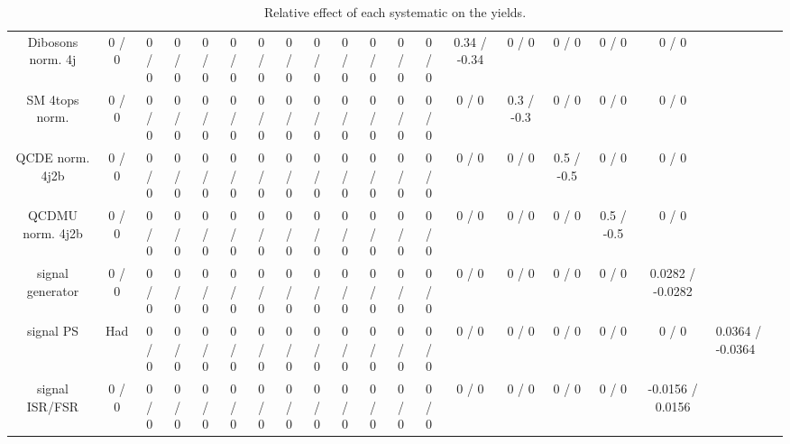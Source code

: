 \documentclass[10pt]{article}
\begin{document}
\begin{table}[htbp]
\begin{center}
\begin{tabular}{|c|c|c|c|c|c|c|c|c|c|c|c|c|c|c|c|c|c|}
  Dibosons norm. 4j & 0 / 0 & 0 / 0 & 0 / 0 & 0 / 0 & 0 / 0 & 0 / 0 & 0 / 0 & 0 / 0 & 0 / 0 & 0 / 0 & 0 / 0 & 0 / 0 & 0.34 / -0.34 & 0 / 0 & 0 / 0 & 0 / 0 & 0 / 0 \\ 
  SM 4tops norm. & 0 / 0 & 0 / 0 & 0 / 0 & 0 / 0 & 0 / 0 & 0 / 0 & 0 / 0 & 0 / 0 & 0 / 0 & 0 / 0 & 0 / 0 & 0 / 0 & 0 / 0 & 0.3 / -0.3 & 0 / 0 & 0 / 0 & 0 / 0 \\ 
  QCDE norm. 4j2b & 0 / 0 & 0 / 0 & 0 / 0 & 0 / 0 & 0 / 0 & 0 / 0 & 0 / 0 & 0 / 0 & 0 / 0 & 0 / 0 & 0 / 0 & 0 / 0 & 0 / 0 & 0 / 0 & 0.5 / -0.5 & 0 / 0 & 0 / 0 \\ 
  QCDMU norm. 4j2b & 0 / 0 & 0 / 0 & 0 / 0 & 0 / 0 & 0 / 0 & 0 / 0 & 0 / 0 & 0 / 0 & 0 / 0 & 0 / 0 & 0 / 0 & 0 / 0 & 0 / 0 & 0 / 0 & 0 / 0 & 0.5 / -0.5 & 0 / 0 \\ 
  signal generator & 0 / 0 & 0 / 0 & 0 / 0 & 0 / 0 & 0 / 0 & 0 / 0 & 0 / 0 & 0 / 0 & 0 / 0 & 0 / 0 & 0 / 0 & 0 / 0 & 0 / 0 & 0 / 0 & 0 / 0 & 0 / 0 & 0.0282 / -0.0282 \\ 
  signal PS & Had & 0 / 0 & 0 / 0 & 0 / 0 & 0 / 0 & 0 / 0 & 0 / 0 & 0 / 0 & 0 / 0 & 0 / 0 & 0 / 0 & 0 / 0 & 0 / 0 & 0 / 0 & 0 / 0 & 0 / 0 & 0 / 0 & 0.0364 / -0.0364 \\ 
  signal ISR/FSR & 0 / 0 & 0 / 0 & 0 / 0 & 0 / 0 & 0 / 0 & 0 / 0 & 0 / 0 & 0 / 0 & 0 / 0 & 0 / 0 & 0 / 0 & 0 / 0 & 0 / 0 & 0 / 0 & 0 / 0 & 0 / 0 & -0.0156 / 0.0156 \\ 
\hline 
\end{tabular} 
\caption{Relative effect of each systematic on the yields.} 
\end{center} 
\end{table} 
\end{document}
